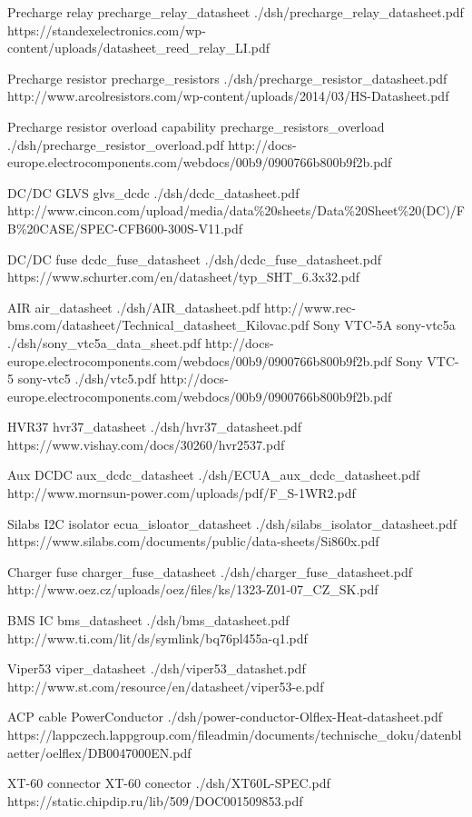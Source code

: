 	{Precharge relay}
	{precharge_relay_datasheet}
	{./dsh/precharge_relay_datasheet.pdf}
	{https://standexelectronics.com/wp-content/uploads/datasheet_reed_relay_LI.pdf}

	{Precharge resistor}
	{precharge_resistors}
	{./dsh/precharge_resistor_datasheet.pdf}
	{http://www.arcolresistors.com/wp-content/uploads/2014/03/HS-Datasheet.pdf}

	{Precharge resistor overload capability}
	{precharge_resistors_overload}
	{./dsh/precharge_resistor_overload.pdf}
	{http://docs-europe.electrocomponents.com/webdocs/00b9/0900766b800b9f2b.pdf}

	{DC/DC GLVS}
	{glvs_dcdc}
	{./dsh/dcdc_datasheet.pdf}
	{http://www.cincon.com/upload/media/data\%20sheets/Data\%20Sheet\%20(DC)/FB\%20CASE/SPEC-CFB600-300S-V11.pdf}

	{DC/DC fuse}
	{dcdc_fuse_datasheet}
	{./dsh/dcdc_fuse_datasheet.pdf}
	{https://www.schurter.com/en/datasheet/typ_SHT_6.3x32.pdf}

	{AIR}
	{air_datasheet}
	{./dsh/AIR_datasheet.pdf}
	{http://www.rec-bms.com/datasheet/Technical_datasheet_Kilovac.pdf}
{Sony VTC-5A}
{sony-vtc5a}
{./dsh/sony_vtc5a_data_sheet.pdf}
{http://docs-europe.electrocomponents.com/webdocs/00b9/0900766b800b9f2b.pdf}
{Sony VTC-5}
{sony-vtc5}
{./dsh/vtc5.pdf}
{http://docs-europe.electrocomponents.com/webdocs/00b9/0900766b800b9f2b.pdf}

	{HVR37}
	{hvr37_datasheet}
	{./dsh/hvr37_datasheet.pdf}
	{https://www.vishay.com/docs/30260/hvr2537.pdf}

	{Aux DCDC}
	{aux_dcdc_datasheet}
	{./dsh/ECUA_aux_dcdc_datasheet.pdf}
	{http://www.mornsun-power.com/uploads/pdf/F_S-1WR2.pdf}

	{Silabs I2C isolator}
	{ecua_isloator_datasheet}
	{./dsh/silabs_isolator_datasheet.pdf}
	{https://www.silabs.com/documents/public/data-sheets/Si860x.pdf}

	{Charger fuse}
	{charger_fuse_datasheet}
	{./dsh/charger_fuse_datasheet.pdf}
	{http://www.oez.cz/uploads/oez/files/ks/1323-Z01-07_CZ_SK.pdf}

	{BMS IC}
	{bms_datasheet}
	{./dsh/bms_datasheet.pdf}
	{http://www.ti.com/lit/ds/symlink/bq76pl455a-q1.pdf}

	{Viper53}
	{viper_datasheet}
	{./dsh/viper53_datashet.pdf}
	{http://www.st.com/resource/en/datasheet/viper53-e.pdf}

	{ACP cable}
	{PowerConductor}
	{./dsh/power-conductor-Olflex-Heat-datasheet.pdf}
	{https://lappczech.lappgroup.com/fileadmin/documents/technische_doku/datenblaetter/oelflex/DB0047000EN.pdf}

	{XT-60 connector}
	{XT-60 conector}
	{./dsh/XT60L-SPEC.pdf}
	{https://static.chipdip.ru/lib/509/DOC001509853.pdf}
